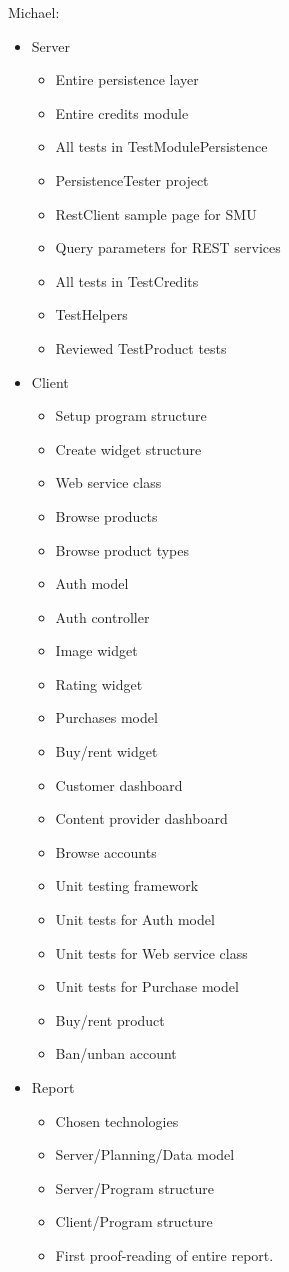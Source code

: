 Michael: 
\begin{itemize}
	\item Server
	\begin{itemize}
		\item Entire persistence layer
		\item Entire credits module
		\item All tests in TestModulePersistence
		\item PersistenceTester project
		\item RestClient sample page for SMU
		\item Query parameters for REST services
		\item All tests in TestCredits
		\item TestHelpers
		\item Reviewed TestProduct tests
	\end{itemize}
	\item Client
	\begin{itemize}
		\item Setup program structure
		\item Create widget structure
		\item Web service class
		\item Browse products
		\item Browse product types
		\item Auth model
		\item Auth controller
		\item Image widget
		\item Rating widget
		\item Purchases model
		\item Buy/rent widget
		\item Customer dashboard
		\item Content provider dashboard
		\item Browse accounts
		\item Unit testing framework
		\item Unit tests for Auth model
		\item Unit tests for Web service class
		\item Unit tests for Purchase model
		\item Buy/rent product
		\item Ban/unban account
	\end{itemize}
	\item Report
	\begin{itemize}
		\item Chosen technologies
		\item Server/Planning/Data model
		\item Server/Program structure
		\item Client/Program structure
		\item First proof-reading of entire report.
	\end{itemize}
\end{itemize}